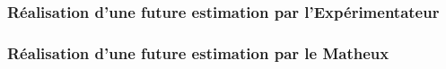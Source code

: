 \documentclass[11pt]{beamer}
\begin{document}
\begin{frame}[label=recap]
\frametitle<1-3>{Réalisation d'une future estimation par l'\textbf{Expérimentateur}}
\frametitle<4-6>{Réalisation d'une future estimation par le \textbf{Matheux}}

\begin{columns}
\begin{column}{5cm}
\begin{center}
\end{center}
\end{column}
\end{columns}
\end{frame}
\end{document}

